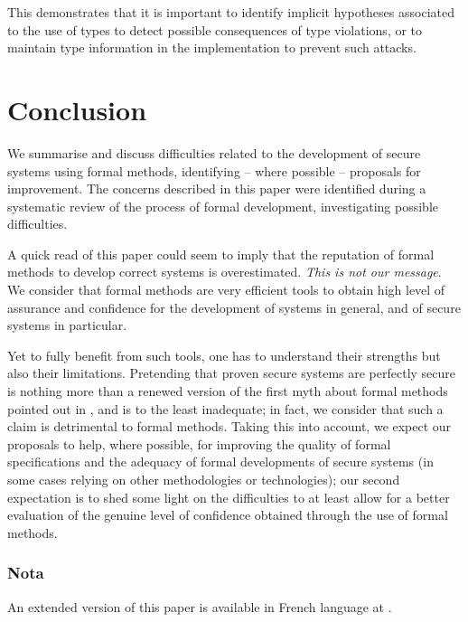 \documentclass[conference]{IEEEtran}
\begin{document}
This demonstrates that it is important to identify implicit hypotheses associated to the use
of types to detect possible consequences of type violations, or to maintain type information
in the implementation to prevent such attacks.

\section{Conclusion}\label{conclusion}

We summarise and discuss difficulties related to the development of secure systems using
formal methods, identifying -- where possible -- proposals for improvement. The concerns
described in this paper were identified during a systematic review of the process of formal
development, investigating possible difficulties.

A quick read of this paper could seem to imply that the reputation of formal methods to
develop correct systems is overestimated. \emph{This is not our message}. We consider that
formal methods are very efficient tools to obtain high level of assurance and confidence for
the development of systems in general, and of secure systems in particular.

Yet to fully benefit from such tools, one has to understand their strengths but also their
limitations. Pretending that proven secure systems are perfectly secure is nothing more than
a renewed version of the first myth about formal methods pointed out in
\cite{10.1109/52.57887}, and is to the least inadequate; in fact, we consider that such a
claim is detrimental to formal methods. Taking this into account, we expect our proposals to
help, where possible, for improving the quality of formal specifications and the adequacy of
formal developments of secure systems (in some cases relying on other methodologies or
technologies); our second expectation is to shed some light on the difficulties to at least
allow for a better evaluation of the genuine level of confidence obtained through the use of
formal methods.

\subsubsection*{Nota}{\small An extended version of this paper is available in French language
at \cite{ssigouv}}.











\end{document}
